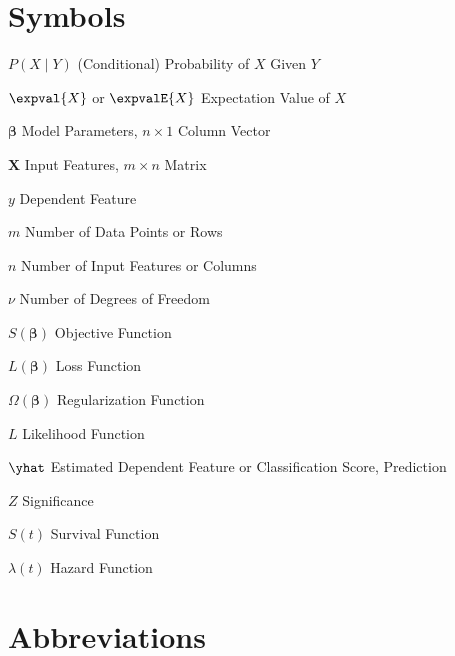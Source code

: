 \abbreviations

\section*{Symbols}

\begin{symbollist}
	\item[$P\left(X \mid Y\right)$] (Conditional) Probability of $X$ Given $Y$
	\item[$\expval{X}$ or $\expvalE{X}$] Expectation Value of $X$
	\item[$\bm{\beta}$] Model Parameters, $n \times 1$ Column Vector
	\item[$\mathbf{X}$] Input Features, $m \times n$ Matrix
	\item[$y$] Dependent Feature
	\item[$m$] Number of Data Points or Rows
	\item[$n$] Number of Input Features or Columns
	\item[$\nu$] Number of Degrees of Freedom
	\item[$S\left(\bm{\beta}\right)$] Objective Function
	\item[$L\left(\bm{\beta}\right)$] Loss Function
	\item[$\Omega\left(\bm{\beta}\right)$] Regularization Function
	\item[$L$] Likelihood Function
	\item[$\yhat$] Estimated Dependent Feature or Classification Score, Prediction
	\item[$Z$] Significance
	\item[$S\left(t\right)$] Survival Function
	\item[$\lambda\left(t\right)$] Hazard Function
\end{symbollist}

\section*{Abbreviations}

